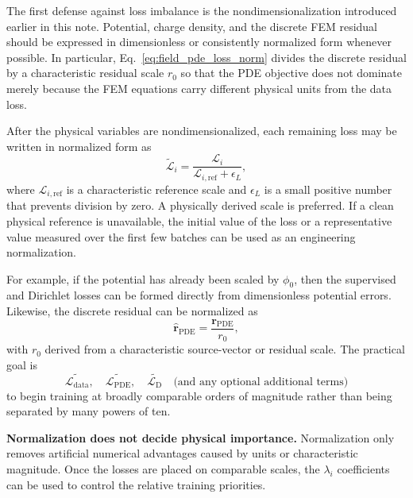 \documentclass[11pt]{article}
\newcommand{\Ldata}{\mathcal{L}_{\mathrm{data}}}
\newcommand{\Lpde}{\mathcal{L}_{\mathrm{PDE}}}
\newcommand{\Ldir}{\mathcal{L}_{\mathrm{D}}}
\begin{document}
The first defense against loss imbalance is the nondimensionalization introduced earlier in this note. Potential, charge density, and the discrete FEM residual should be expressed in dimensionless or consistently normalized form whenever possible. In particular, Eq.~\eqref{eq:field_pde_loss_norm} divides the discrete residual by a characteristic residual scale $r_0$ so that the PDE objective does not dominate merely because the FEM equations carry different physical units from the data loss.

After the physical variables are nondimensionalized, each remaining loss may be written in normalized form as
\begin{equation}
\widetilde{\mathcal{L}}_i
=\frac{\mathcal{L}_i}{\mathcal{L}_{i,\mathrm{ref}}+\epsilon_L},
\label{eq:normalized_loss_generic}
\end{equation}
where $\mathcal{L}_{i,\mathrm{ref}}$ is a characteristic reference scale and $\epsilon_L$ is a small positive number that prevents division by zero. A physically derived scale is preferred. If a clean physical reference is unavailable, the initial value of the loss or a representative value measured over the first few batches can be used as an engineering normalization.

For example, if the potential has already been scaled by $\phi_0$, then the supervised and Dirichlet losses can be formed directly from dimensionless potential errors. Likewise, the discrete residual can be normalized as
\begin{equation}
\hat{\bm{r}}_{\mathrm{PDE}}=\frac{\bm{r}_{\mathrm{PDE}}}{r_0},
\end{equation}
with $r_0$ derived from a characteristic source-vector or residual scale. The practical goal is
\begin{equation}
\widetilde{\Ldata},\quad
\widetilde{\Lpde},\quad
\widetilde{\Ldir}
\quad\text{(and any optional additional terms)}
\end{equation}
to begin training at broadly comparable orders of magnitude rather than being separated by many powers of ten.

\begin{physicsbox}
\textbf{Normalization does not decide physical importance.} Normalization only removes artificial numerical advantages caused by units or characteristic magnitude. Once the losses are placed on comparable scales, the $\lambda_i$ coefficients can be used to control the relative training priorities.
\end{physicsbox}
\end{document}
